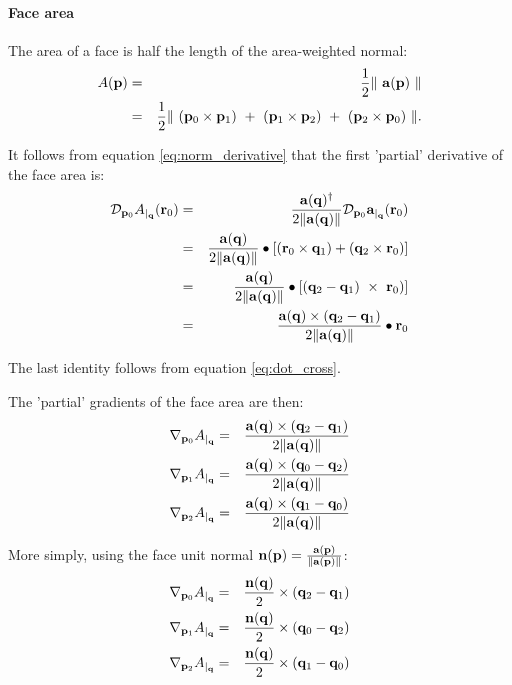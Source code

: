 \paragraph{Face area}
\label{sec:facearea}

The area of a face is half the length of the area-weighted normal:
\begin{eqnarray}
A({\mathbf p})
& = & {1 \over 2} \| \ {\mathbf a}({\mathbf p}) \ \|  \\
& = & {1 \over 2} \| \ ({\mathbf p}_0 \times {\mathbf p}_1) \ + \ ({\mathbf p}_1 \times {\mathbf p}_2) \ + \ ({\mathbf p}_2 \times {\mathbf p}_0) \ \|.
\nonumber
\end{eqnarray}

It follows from equation \ref{eq:norm_derivative}
that the first 'partial' derivative of the face area is:
\begin{eqnarray}
\label{eq:area_partial_derivative}
\Dd{\p_0}{A}{\q}{\r_0}
& = &
{{\a(\q)^\dagger} \over {2\|\a(\q)\|}}
{\Dd{\p_0}{\a}{\q}{\r_0}}  \\
& = &
{{\a(\q)} \over {2\|\a(\q)\|}}
\bullet
\left[(\r_0 \times \q_1) + (\q_2 \times \r_0)\right] \nonumber \\
& = &
{{\a(\q)} \over {2\|\a(\q)\|}}
\bullet
\left[(\q_2 - \q_1) \ \times \  \r_0)\right] \nonumber \\
& = &
{{\a(\q) \times (\q_2 - \q_1)} \over {2\|\a(\q)\|}}
\bullet
\r_0 \nonumber
\end{eqnarray}

The last identity follows from equation \ref{eq:dot_cross}.

The 'partial' gradients of the face area are then:
\begin{eqnarray}
{\mathbf \nabla}_{{\mathbf p}_0}{{A}}_{\mid_{{\mathbf q}}} & = & {{{\mathbf a}({\mathbf q}) \times ({\mathbf q}_2 - {\mathbf q}_1)} \over {2\|{\mathbf a}({\mathbf q})\|}} \\
{\mathbf \nabla}_{{\mathbf p}_1}{{A}}_{\mid_{{\mathbf q}}} & = & {{{\mathbf a}({\mathbf q}) \times ({\mathbf q}_0 - {\mathbf q}_2)} \over {2\|{\mathbf a}({\mathbf q})\|}} \nonumber \\
{\mathbf \nabla}_{{\mathbf p}_2}{{A}}_{\mid_{{\mathbf q}}} & = & {{{\mathbf a}({\mathbf q}) \times ({\mathbf q}_1 - {\mathbf q}_0)} \over {2\|{\mathbf a}({\mathbf q})\|}} \nonumber
\end{eqnarray}

More simply, using the face unit normal \( {\mathbf n}({\mathbf p})  =  {{{\mathbf a}({\mathbf p})} \over {\| {\mathbf a}({\mathbf p}) \|}} \):
\begin{eqnarray}
\label{eq:area_gradient}
\Gc{\p_0}{A}{\q} & = & \frac{\n(\q)}{2} \times (\q_2 - \q_1) \\
\Gc{\p_1}{A}{\q} & = & \frac{\n(\q)}{2} \times (\q_0 - \q_2) \nonumber \\
\Gc{\p_2}{A}{\q} & = & \frac{\n(\q)}{2} \times (\q_1 - \q_0) \nonumber
\end{eqnarray}

